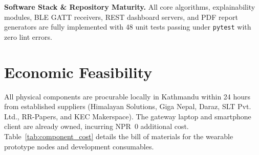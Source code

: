 \textbf{Software Stack \& Repository Maturity.}
All core algorithms, explainability modules, BLE GATT receivers, REST dashboard servers, and PDF report generators are fully implemented with 48 unit tests passing under \texttt{pytest} with zero lint errors.

\section{Economic Feasibility}

All physical components are procurable locally in Kathmandu within 24 hours from established suppliers (Himalayan Solutions, Giga Nepal, Daraz, SLT Pvt. Ltd., RR-Papers, and KEC Makerspace). The gateway laptop and smartphone client are already owned, incurring NPR~0 additional cost. Table~\ref{tab:component_cost} details the bill of materials for the wearable prototype nodes and development consumables.

